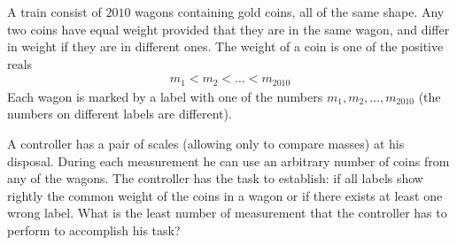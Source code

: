 A train consist of $2010$ wagons containing gold coins, all of the same shape. Any two coins have equal weight provided that they are in the same wagon, and differ in weight if they are in different ones. The weight of a coin is one of the positive reals
\begin{align*} m_1 <m_2 <\ldots <m_{2010} \end{align*}Each wagon is marked by a label with one of the numbers $m_1,m_2, \ldots , m_{2010}$ (the numbers on different labels are different).

A controller has a pair of scales (allowing only to compare masses) at his disposal. During each measurement he can use an arbitrary number of coins from any of the wagons. The controller has the task to establish: if all labels show rightly the common weight of the coins in a wagon or if there exists at least one wrong label. What is the least number of measurement that the controller has to perform to accomplish his task?